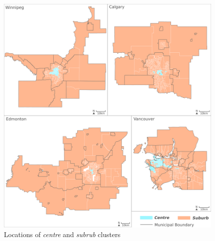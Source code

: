 \begin{figure}[H]
	\centering
	\includegraphics[width=6in]{figures/E_mini_2.png}
	\caption{Locations of \textit{centre} and \textit{subrub} clusters}
	\label{fig:mm1}
\end{figure}




